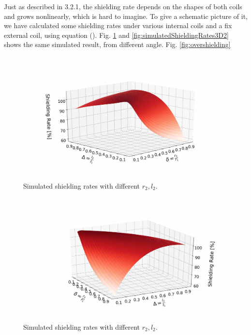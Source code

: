 Just as described in 3.2.1, the shielding rate depends on the shapes of both coils and grows nonlinearly,
which is hard to imagine.
To give a schematic picture of it, we have calculated some shielding rates under various internal coils and a fix external coil,
using equation ().
Fig. \ref{fig:simulatedShieldingRates3D1} and \ref{fig:simulatedShieldingRates3D2} shows the same simulated result,
from different angle.
Fig. \ref{fig:overshielding}
\begin{figure}[H]
  \includegraphics[width=17cm, bb=9 9 900 550]{./section3Effectiveness/simulatedShieldingRates3D1.JPEG}
  \caption{Simulated shielding rates with different $r_2, l_2$.}
  \label{fig:simulatedShieldingRates3D1}
\end{figure}
\begin{figure}[H]
  \includegraphics[width=17cm, bb=9 9 900 550]{./section3Effectiveness/simulatedShieldingRates3D2.JPEG}
  \caption{Simulated shielding rates with different $r_2, l_2$.}
  \label{fig:3D2}
\end{figure}
